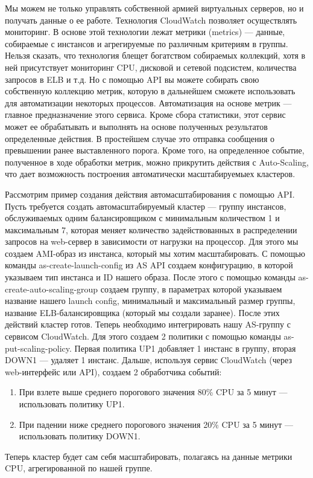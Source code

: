 \documentclass[10pt, a5paper]{article}
\begin{document}
Мы можем не только управлять собственной армией виртуальных серверов, но и получать данные о ее работе. Технология \linebreak CloudWatch позволяет осуществлять мониторинг. В основе этой технологии лежат метрики (metrics) --- данные, собираемые с инстансов и агрегируемые по различным критериям в группы. Нельзя сказать, что технология блещет богатством собираемых коллекций, хотя в ней присутствует мониторинг CPU, дисковой и сетевой подсистем, количества запросов в ELB и т.д. Но с помощью API вы можете собирать свою собственную коллекцию метрик, которую в дальнейшем сможете использовать для автоматизации некоторых процессов. Автоматизация на основе метрик --- главное предназначение этого сервиса. Кроме сбора статистики, этот сервис может ее обрабатывать и выполнять на основе полученных результатов определенные действия. В простейшем случае это отправка сообщения о превышении ранее выставленного порога. Кроме того, на определенное событие, полученное в ходе обработки метрик, можно прикрутить действия с Auto-Scaling, что дает возможность построения автоматически масштабируемыех кластеров. 

Рассмотрим пример создания действия автомасштабирования с помощью API. Пусть требуется создать автомасштабируемый кластер --- группу инстансов, обслуживаемых одним балансировщиком с минимальным количеством 1 и максимальным 7, которая меняет количество задействованных в распределении запросов на web-сервер в зависимости от нагрузки на процессор. Для этого мы создаем AMI-образ из инстанса, который мы хотим масштабировать. С помощью команды as-create-launch-config из AS API создаем конфигурацию, в которой указываем тип инстанса и ID нашего образа. После этого с помощью команды as-create-auto-scaling-group создаем группу, в параметрах которой указываем название нашего launch config, минимальный и максимальный размер группы, название ELB-балансировщика (который мы создали заранее). После этих действий кластер готов. Теперь необходимо интегрировать нашу AS-группу с сервисом CloudWatch. Для этого создаем 2 политики с помощью команды as-put-scaling-policy. Первая политика UP1 добавляет 1 инстанс в группу, вторая DOWN1 --- удаляет 1 инстанс. Дальше, используя сервис CloudWatch (через web-интерфейс или API), создаем 2 обработчика событий: 
\begin{enumerate}
	\item При взлете выше среднего порогового значения 80\% CPU за 5 минут --- использовать политику UP1. 
	\item При падении ниже среднего порогового значения 20\% CPU за 5 минут --- использовать политику DOWN1. 
\end{enumerate}
Теперь кластер будет сам себя масштабировать, полагаясь на данные метрики CPU, агрегированной по нашей группе. 
\end{document}
